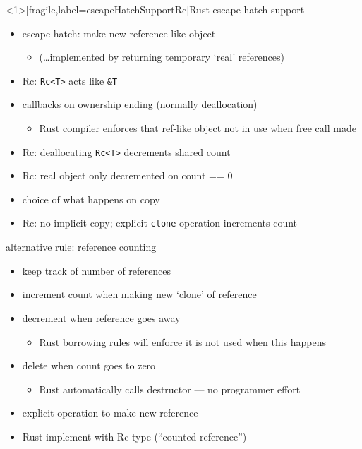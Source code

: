 \begin{frame}<1>[fragile,label=escapeHatchSupportRc]{Rust escape hatch support}
    \begin{itemize}
        \item escape hatch: make new reference-like object
            \begin{itemize}
            \item (\ldots implemented by returning temporary `real' references)
            \end{itemize}
        \item<2> Rc: \verb|Rc<T>| acts like \verb|&T|
        \item callbacks on ownership ending (normally deallocation)
            \begin{itemize}
            \item Rust compiler enforces that ref-like object not in use when free call made
            \end{itemize}
        \item<2> Rc: deallocating \verb|Rc<T>| decrements shared count
        \item<2> Rc: real object only decremented on count == 0
        \item choice of what happens on copy
        \item<2> Rc: no implicit copy; explicit \verb|clone| operation increments count
    \end{itemize}
\end{frame}
 
\begin{frame}[fragile,label=refCounting]{alternative rule: reference counting}
    \begin{itemize}
    \item keep track of number of references
    \item increment count when making new `clone' of reference
    \item decrement when reference goes away
        \begin{itemize}
        \item Rust borrowing rules will enforce it is not used when this happens
        \end{itemize}
    \item delete when count goes to zero
        \begin{itemize}
        \item Rust automatically calls destructor --- no programmer effort
        \end{itemize}
    \item explicit operation to make new reference
    \item Rust implement with Rc type (``counted reference'')
    \end{itemize}
\end{frame}

